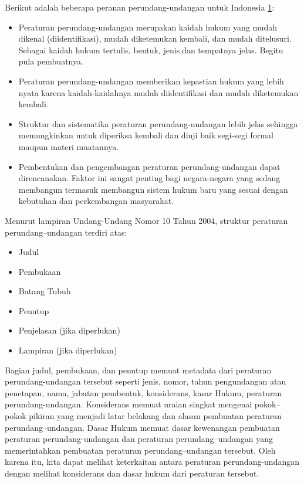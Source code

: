 Berikut adalah beberapa peranan perundang-undangan untuk Indonesia
\href{https://www.pustaka.ut.ac.id/lib/wp-content/uploads/pdfmk/HKUM4403-M1.pdf}{1}:

\begin{itemize}
\itemsep1pt\parskip0pt
\item
  Peraturan perundang-undangan merupakan kaidah hukum yang mudah dikenal
  (diidentifikasi), mudah diketemukan kembali, dan mudah ditelusuri.
  Sebagai kaidah hukum tertulis, bentuk, jenis,dan tempatnya jelas.
  Begitu pula pembuatnya.
\item
  Peraturan perundang-undangan memberikan kepastian hukum yang lebih
  nyata karena kaidah-kaidahnya mudah diidentifikasi dan mudah
  diketemukan kembali.
\item
  Struktur dan sistematika peraturan perundang-undangan lebih jelas
  sehingga memungkinkan untuk diperiksa kembali dan diuji baik segi-segi
  formal maupun materi muatannya.
\item
  Pembentukan dan pengembangan peraturan perundang-undangan dapat
  direncanakan. Faktor ini sangat penting bagi negara-negara yang sedang
  membangun termasuk membangun sistem hukum baru yang sesuai dengan
  kebutuhan dan perkembangan masyarakat.
\end{itemize}

Menurut lampiran Undang-Undang Nomor 10 Tahun 2004, struktur peraturan
perundang--undangan terdiri atas:

\begin{itemize}
\itemsep1pt\parskip0pt
\item
  Judul
\item
  Pembukaan
\item
  Batang Tubuh
\item
  Penutup
\item
  Penjelasan (jika diperlukan)
\item
  Lampiran (jika diperlukan)
\end{itemize}

Bagian judul, pembukaan, dan penutup memuat metadata dari peraturan
perundang-undangan tersebut seperti jenis, nomor, tahun pengundangan
atau penetapan, nama, jabatan pembentuk, konsiderans, kasar Hukum,
peraturan perundang-undangan. Konsiderans memuat uraian singkat mengenai
pokok--pokok pikiran yang menjadi latar belakang dan alasan pembuatan
peraturan perundang--undangan. Dasar Hukum memuat dasar kewenangan
pembuatan peraturan perundang-undangan dan peraturan perundang--undangan
yang memerintahkan pembuatan peraturan perundang--undangan tersebut.
Oleh karena itu, kita dapat melihat keterkaitan antara peraturan
perundang-undangan dengan melihat konsiderans dan dasar hukum dari
peraturan tersebut.

